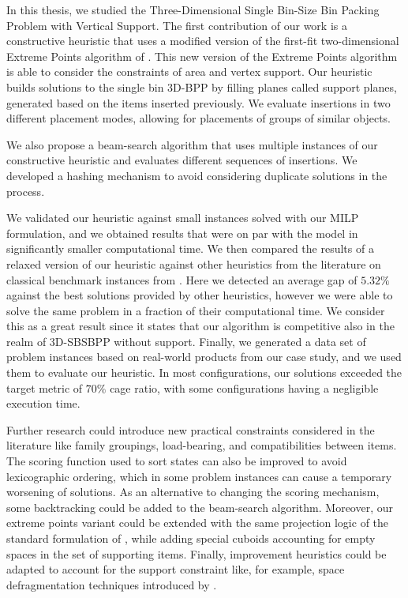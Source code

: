 In this thesis, we studied the Three-Dimensional Single Bin-Size Bin Packing Problem with Vertical Support.
The first contribution of our work is a constructive heuristic that uses a modified version of the first-fit two-dimensional Extreme Points algorithm of \citet{crainic2008extreme}. This new version of the Extreme Points algorithm is able to consider the constraints of area and vertex support.
Our heuristic builds solutions to the single bin 3D-BPP by filling planes called support planes, generated based on the items inserted previously.
We evaluate insertions in two different placement modes, allowing for placements of groups of similar objects.

We also propose a beam-search algorithm that uses multiple instances of our constructive heuristic and evaluates different sequences of insertions. We developed a hashing mechanism to avoid considering duplicate solutions in the process.

We validated our heuristic against small instances solved with our MILP formulation, and we obtained results that were on par with the model in significantly smaller computational time.
We then compared the results of a relaxed version of our heuristic against other heuristics from the literature on classical benchmark instances from \citet{martello2000three}. Here we detected an average gap of $5.32\%$ against the best solutions provided by other heuristics, however we were able to solve the same problem in a fraction of their computational time. We consider this as a great result since it states that our algorithm is competitive also in the realm of 3D-SBSBPP without support.
Finally, we generated a data set of problem instances based on real-world products from our case study, and we used them to evaluate our heuristic. In most configurations, our solutions exceeded the target metric of $70\%$ cage ratio, with some configurations having a negligible execution time.

Further research could introduce new practical constraints considered in the literature like family groupings, load-bearing, and compatibilities between items.
The scoring function used to sort states can also be improved to avoid lexicographic ordering, which in some problem instances can cause a temporary worsening of solutions.
As an alternative to changing the scoring mechanism, some backtracking could be added to the beam-search algorithm.
Moreover, our extreme points variant could be extended with the same projection logic of the standard formulation of \citet{crainic2008extreme}, while adding special cuboids accounting for empty spaces in the set of supporting items.
Finally, improvement heuristics could be adapted to account for the support constraint like, for example, space defragmentation techniques introduced by \cite{ZHU2012452}.